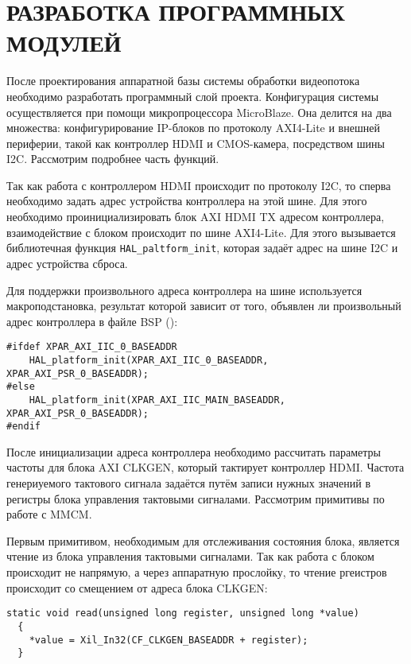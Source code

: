 \section{РАЗРАБОТКА ПРОГРАММНЫХ МОДУЛЕЙ}
\label{sec:software_modules}

После проектирования аппаратной базы системы обработки видеопотока
необходимо разработать программный слой проекта. Конфигурация системы
осуществляется при помощи микропроцессора MicroBlaze. Она делится
на два множества: конфигурирование IP-блоков по протоколу AXI4-Lite и
внешней периферии, такой как контроллер HDMI и CMOS-камера, посредством
шины I2C. Рассмотрим подробнее часть функций.


Так как работа с контроллером HDMI происходит по протоколу I2C, то
сперва необходимо задать адрес устройства контроллера на этой шине.
Для этого необходимо проинициализировать блок AXI HDMI TX адресом контроллера,
взаимодействие с блоком происходит по шине AXI4-Lite.
Для этого вызывается библиотечная функция \texttt{HAL\_paltform\_init}, которая
задаёт адрес на шине I2C и адрес устройства сброса.

Для поддержки произвольного адреса контроллера на шине используется макроподстановка,
результат которой зависит от того, объявлен ли произвольный адрес контроллера в файле
BSP ():
\medskip
\begin{lstlisting}[style=C]
#ifdef XPAR_AXI_IIC_0_BASEADDR
	HAL_platform_init(XPAR_AXI_IIC_0_BASEADDR, XPAR_AXI_PSR_0_BASEADDR);
#else
  	HAL_platform_init(XPAR_AXI_IIC_MAIN_BASEADDR, XPAR_AXI_PSR_0_BASEADDR);
#endif
\end{lstlisting}
\medskip

После инициализации адреса контроллера необходимо рассчитать параметры
частоты для блока AXI CLKGEN, который тактирует контроллер HDMI.
Частота генериуемого тактового сигнала задаётся путём записи нужных
значений в регистры блока управления тактовыми сигналами. Рассмотрим
примитивы по работе с MMCM.

Первым примитивом, необходимым для отслеживания состояния блока, является
чтение из блока управления тактовыми сигналами. Так как работа с блоком происходит
не напрямую, а через аппаратную прослойку, то чтение ргеистров происходит со смещением
от адреса блока CLKGEN:
\medskip
\begin{lstlisting}[style=C]
  static void read(unsigned long register, unsigned long *value)
  {
	*value = Xil_In32(CF_CLKGEN_BASEADDR + register);
  }
\end{lstlisting}
\medskip

